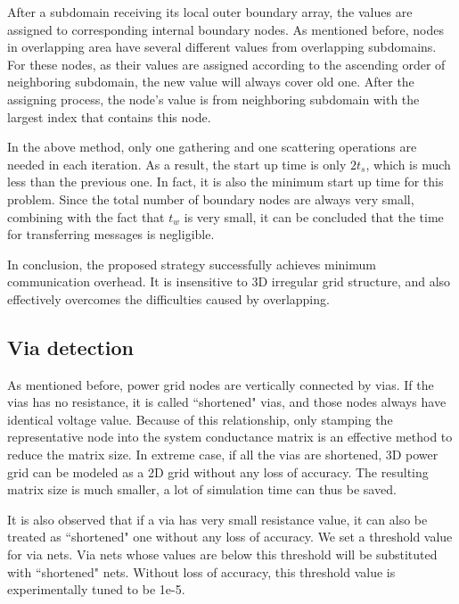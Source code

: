 \documentclass{sig-alternate}
\begin{document}
	After a subdomain receiving its local outer boundary array, the values are assigned to corresponding internal boundary 
	nodes. As 
	mentioned before, nodes in overlapping area have several different values from overlapping subdomains. For these nodes, 
	as their values are assigned according to the ascending order of neighboring subdomain, the new value will always cover old one. 
	After the assigning process, the node's value is from neighboring subdomain with the largest index that contains this node.  
	
	In the above method, only one gathering and one scattering operations are needed in each iteration. As a result, the start up time 
	is only $2t_s$, which is much less than the previous one. In fact, it is also the minimum 
	start up time for this problem. Since the total number 
	of boundary nodes are always very small, combining with the fact that $t_w$ is very small, it can be concluded that the 
	time for transferring messages is negligible. 

	In conclusion, the proposed strategy successfully achieves minimum communication overhead. It is insensitive to 3D irregular 
	grid structure, and also effectively overcomes the difficulties caused by overlapping.	
  \subsection{Via detection}
	As mentioned before, power grid nodes are vertically connected by vias. If the vias has no 
	resistance, it is called ``shortened" vias, and those nodes always have identical voltage value. Because of this relationship, 
	only stamping the representative
	node into the system conductance matrix is an effective method to reduce the matrix size. In extreme case, if all the
	vias are shortened, 3D power grid can be modeled as a 2D grid without any loss of accuracy. The resulting matrix size
	is much smaller, a lot of simulation time can thus be saved. 
 
	It is also observed that if a via has very small resistance value, it can also be treated as ``shortened" one 
	without any loss of accuracy. We set a threshold value for via nets. Via nets 
	whose values are below this threshold will be substituted with ``shortened" nets. Without loss of accuracy, this threshold value 
	is experimentally tuned to be 1e-5. 
\end{document}

